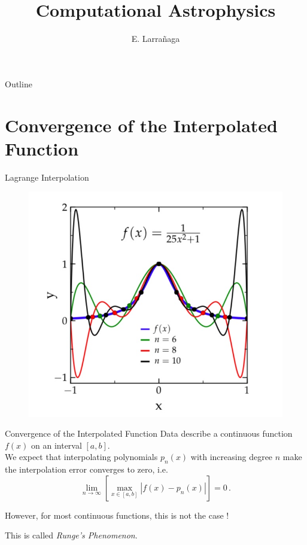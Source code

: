 \documentclass[11pt]{beamer}
\begin{document}
\begin{frame}
\title{Computational Astrophysics}
\author{E. Larrañaga}
\titlepage
\end{frame}

\begin{frame}{Outline}
\tableofcontents
\end{frame}

\section{Convergence of the Interpolated Function}

\begin{frame}[fragile]{Lagrange Interpolation}
\begin{figure}
\includegraphics[scale=0.3]{interpolationExample.jpeg}
\end{figure}
\end{frame}

\begin{frame}[fragile]{Convergence of the Interpolated Function}
Data describe a continuous function $f(x)$ on an interval
$[a,b]$.\\
\pause
We expect that interpolating polynomials $p_n(x)$ with increasing degree $n$ make the interpolation
error converges to zero, i.e. \\
\begin{equation}
\lim_{n \to \infty} \left[ \max_{x \in [a,b]} |f(x) - p_n(x)|\right] = 0\,.
\end{equation} 
\pause

However,  for most continuous functions, this is not the case ! \\

\pause

This is called \emph{Runge's Phenomenon}. 
\end{frame}
\end{document}
